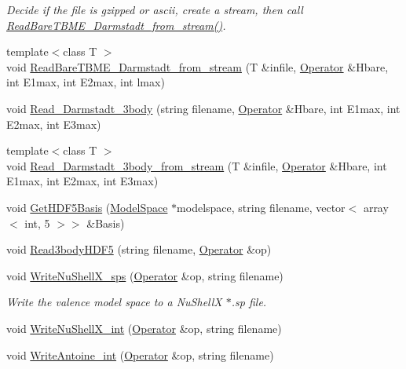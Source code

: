 \begin{DoxyCompactItemize}
\begin{DoxyCompactList}\small\item\em Decide if the file is gzipped or ascii, create a stream, then call \hyperlink{classReadWrite_a44acf6835321a8bee6a795523728da2e}{Read\-Bare\-T\-B\-M\-E\-\_\-\-Darmstadt\-\_\-from\-\_\-stream()}. \end{DoxyCompactList}\item 
{\footnotesize template$<$class T $>$ }\\void \hyperlink{classReadWrite_a44acf6835321a8bee6a795523728da2e}{Read\-Bare\-T\-B\-M\-E\-\_\-\-Darmstadt\-\_\-from\-\_\-stream} (T \&infile, \hyperlink{classOperator}{Operator} \&Hbare, int E1max, int E2max, int lmax)
\item 
void \hyperlink{classReadWrite_a84c0cbaf2be415eadffb560ea0bb9785}{Read\-\_\-\-Darmstadt\-\_\-3body} (string filename, \hyperlink{classOperator}{Operator} \&Hbare, int E1max, int E2max, int E3max)
\item 
{\footnotesize template$<$class T $>$ }\\void \hyperlink{classReadWrite_af229332b05276f686966fdaaa98a81fd}{Read\-\_\-\-Darmstadt\-\_\-3body\-\_\-from\-\_\-stream} (T \&infile, \hyperlink{classOperator}{Operator} \&Hbare, int E1max, int E2max, int E3max)
\item 
void \hyperlink{classReadWrite_ad03f489c69c98d3ff1d33fbe9801c3d1}{Get\-H\-D\-F5\-Basis} (\hyperlink{classModelSpace}{Model\-Space} $\ast$modelspace, string filename, vector$<$ array$<$ int, 5 $>$$>$ \&Basis)
\item 
void \hyperlink{classReadWrite_a52656073ac0fa73c78dbd67c0f0e81e3}{Read3body\-H\-D\-F5} (string filename, \hyperlink{classOperator}{Operator} \&op)
\item 
\hypertarget{classReadWrite_a8a7dc85b22c8f468d153d3fde9f39394}{void \hyperlink{classReadWrite_a8a7dc85b22c8f468d153d3fde9f39394}{Write\-Nu\-Shell\-X\-\_\-sps} (\hyperlink{classOperator}{Operator} \&op, string filename)}\label{classReadWrite_a8a7dc85b22c8f468d153d3fde9f39394}

\begin{DoxyCompactList}\small\item\em Write the valence model space to a Nu\-Shell\-X $\ast$.sp file. \end{DoxyCompactList}\item 
void \hyperlink{classReadWrite_a2028159ab7f8c227613834b39794e157}{Write\-Nu\-Shell\-X\-\_\-int} (\hyperlink{classOperator}{Operator} \&op, string filename)
\item 
\hypertarget{classReadWrite_a371194595d9412cbb8f1b432a6526f5a}{void \hyperlink{classReadWrite_a371194595d9412cbb8f1b432a6526f5a}{Write\-Antoine\-\_\-int} (\hyperlink{classOperator}{Operator} \&op, string filename)}\label{classReadWrite_a371194595d9412cbb8f1b432a6526f5a}


\end{DoxyCompactItemize}
